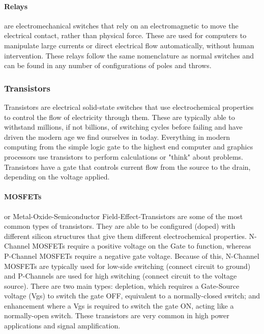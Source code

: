 
        \paragraph*{Relays} are electromechanical switches that rely on an electromagnetic to move the electrical contact, rather than physical force.
        These are used for computers to manipulate large currents or direct electrical flow automatically, without human intervention.
        These relays follow the same nomenclature as normal switches and can be found in any number of configurations of poles and throws.


        \subsubsection*{Transistors}
        Transistors are electrical solid-state switches that use electrochemical properties to control the flow of electricity through them.
        These are typically able to withstand millions, if not billions, of switching cycles before failing and have driven the modern age we find ourselves in today.
        Everything in modern computing from the simple logic gate to the highest end computer and graphics processors use transistors to perform calculations or "think" about problems.
        Transistors have a gate that controls current flow from the source to the drain, depending on the voltage applied.


        \paragraph*{MOSFETs} or Metal-Oxide-Semiconductor Field-Effect-Transistors are some of the most common types of transistors.
        They are able to be configured (doped) with different silicon structures that give them different electrochemical properties.
        N-Channel MOSFETs require a positive voltage on the Gate to function, whereas P-Channel MOSFETs require a negative gate voltage.
        Because of this, N-Channel MOSFETs are typically used for low-side switching (connect circuit to ground) and P-Channels are used for high switching (connect circuit to the voltage source). 
        There are two main types: depletion, which requires a Gate-Source voltage (Vgs) to switch the gate OFF, equivalent to a normally-closed switch; and enhancement where a Vgs is required to switch the gate ON, acting like a normally-open switch.
        These transistors are very common in high power applications and signal amplification.

